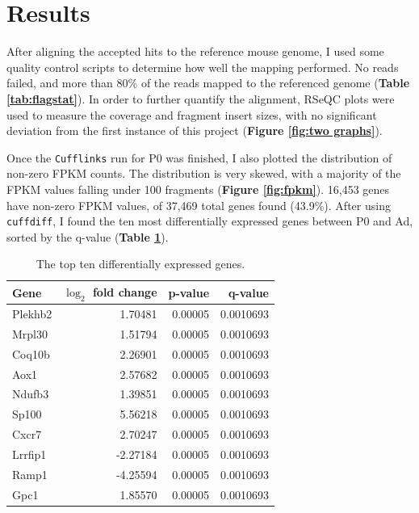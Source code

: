 \documentclass{article}
\begin{document}
\section{Results}

After aligning the accepted hits to the reference mouse genome, I used some quality control scripts to determine how well the mapping performed. No reads failed, and more than 80\% of the reads mapped to the referenced genome (\textbf{Table \ref{tab:flagstat}}). In order to further quantify the alignment, RSeQC plots were used to measure the coverage and fragment insert sizes, with no significant deviation from the first instance of this project (\textbf{Figure \ref{fig:two graphs}}).

Once the \texttt{Cufflinks} run for P0 was finished, I also plotted the distribution of non-zero FPKM counts. The distribution is very skewed, with a majority of the FPKM values falling under 100 fragments (\textbf{Figure \ref{fig:fpkm}}). 16,453 genes have non-zero FPKM values, of 37,469 total genes found (43.9\%). After using \texttt{cuffdiff}, I found the ten most differentially expressed genes between P0 and Ad, sorted by the q-value (\textbf{Table \ref{tab:topgenes}}).

\begin{table}[hb]
    \centering
    \begin{tabular}{|l|r|r|r|}
\hline
Gene & $\log_2$ fold change & p-value & q-value\\\hline\hline
Plekhb2 & 1.70481 & 0.00005 & 0.0010693\\\hline
Mrpl30 & 1.51794 & 0.00005 & 0.0010693\\\hline
Coq10b & 2.26901 & 0.00005 & 0.0010693\\\hline
Aox1 & 2.57682 & 0.00005 & 0.0010693\\\hline
Ndufb3 & 1.39851 & 0.00005 & 0.0010693\\\hline
Sp100 & 5.56218 & 0.00005 & 0.0010693\\\hline
Cxcr7 & 2.70247 & 0.00005 & 0.0010693\\\hline
Lrrfip1 & -2.27184 & 0.00005 & 0.0010693\\\hline
Ramp1 & -4.25594 & 0.00005 & 0.0010693\\\hline
Gpc1 & 1.85570 & 0.00005 & 0.0010693\\\hline
\end{tabular}
    \caption{The top ten differentially expressed genes.}
    \label{tab:topgenes}
\end{table}
\end{document}
